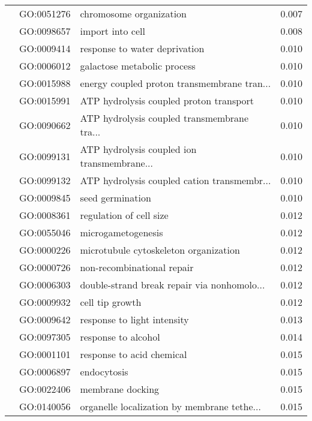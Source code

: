 \begin{longtable}{lllr}
   & GO:0051276 &                      chromosome organization &         0.007 \\
   & GO:0098657 &                             import into cell &         0.008 \\
   & GO:0009414 &                response to water deprivation &         0.010 \\
   & GO:0006012 &                  galactose metabolic process &         0.010 \\
   & GO:0015988 &  energy coupled proton transmembrane tran... &         0.010 \\
   & GO:0015991 &      ATP hydrolysis coupled proton transport &         0.010 \\
   & GO:0090662 &  ATP hydrolysis coupled transmembrane tra... &         0.010 \\
   & GO:0099131 &  ATP hydrolysis coupled ion transmembrane... &         0.010 \\
   & GO:0099132 &  ATP hydrolysis coupled cation transmembr... &         0.010 \\
   & GO:0009845 &                             seed germination &         0.010 \\
   & GO:0008361 &                      regulation of cell size &         0.012 \\
   & GO:0055046 &                           microgametogenesis &         0.012 \\
   & GO:0000226 &        microtubule cytoskeleton organization &         0.012 \\
   & GO:0000726 &                   non-recombinational repair &         0.012 \\
   & GO:0006303 &  double-strand break repair via nonhomolo... &         0.012 \\
   & GO:0009932 &                              cell tip growth &         0.012 \\
   & GO:0009642 &                  response to light intensity &         0.013 \\
   & GO:0097305 &                          response to alcohol &         0.014 \\
   & GO:0001101 &                    response to acid chemical &         0.015 \\
   & GO:0006897 &                                  endocytosis &         0.015 \\
   & GO:0022406 &                             membrane docking &         0.015 \\
   & GO:0140056 &  organelle localization by membrane tethe... &         0.015 \\

\end{longtable}
